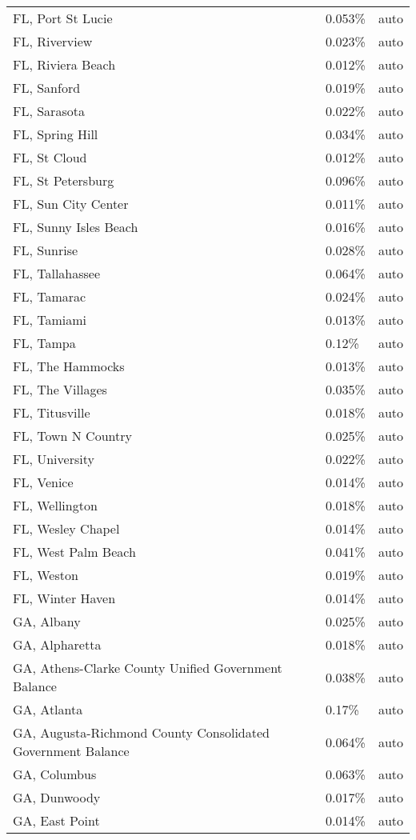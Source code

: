 \begin{longtable}[]{@{}lll@{}}
FL, Port St Lucie & 0.053\% & auto \\
FL, Riverview & 0.023\% & auto \\
FL, Riviera Beach & 0.012\% & auto \\
FL, Sanford & 0.019\% & auto \\
FL, Sarasota & 0.022\% & auto \\
FL, Spring Hill & 0.034\% & auto \\
FL, St Cloud & 0.012\% & auto \\
FL, St Petersburg & 0.096\% & auto \\
FL, Sun City Center & 0.011\% & auto \\
FL, Sunny Isles Beach & 0.016\% & auto \\
FL, Sunrise & 0.028\% & auto \\
FL, Tallahassee & 0.064\% & auto \\
FL, Tamarac & 0.024\% & auto \\
FL, Tamiami & 0.013\% & auto \\
FL, Tampa & 0.12\% & auto \\
FL, The Hammocks & 0.013\% & auto \\
FL, The Villages & 0.035\% & auto \\
FL, Titusville & 0.018\% & auto \\
FL, Town N Country & 0.025\% & auto \\
FL, University & 0.022\% & auto \\
FL, Venice & 0.014\% & auto \\
FL, Wellington & 0.018\% & auto \\
FL, Wesley Chapel & 0.014\% & auto \\
FL, West Palm Beach & 0.041\% & auto \\
FL, Weston & 0.019\% & auto \\
FL, Winter Haven & 0.014\% & auto \\
GA, Albany & 0.025\% & auto \\
GA, Alpharetta & 0.018\% & auto \\
GA, Athens-Clarke County Unified Government Balance & 0.038\% & auto \\
GA, Atlanta & 0.17\% & auto \\
GA, Augusta-Richmond County Consolidated Government Balance & 0.064\% &
auto \\
GA, Columbus & 0.063\% & auto \\
GA, Dunwoody & 0.017\% & auto \\
GA, East Point & 0.014\% & auto \\

\end{longtable}
